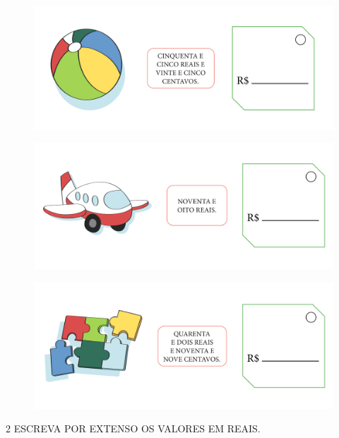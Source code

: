 \begin{figure}[htpb!]
\includegraphics[width=\textwidth]{../ilustracoes/MAT1/SAEB_1ANO_MAT_FIGURA66.png}
\end{figure}

\begin{figure}[htpb!]
\includegraphics[width=\textwidth]{../ilustracoes/MAT1/SAEB_1ANO_MAT_FIGURA67.png}
\end{figure}

\begin{figure}[htpb!]
\includegraphics[width=\textwidth]{../ilustracoes/MAT1/SAEB_1ANO_MAT_FIGURA68.png}
\end{figure}

\pagebreak

\num{2} ESCREVA POR EXTENSO OS VALORES EM REAIS.


